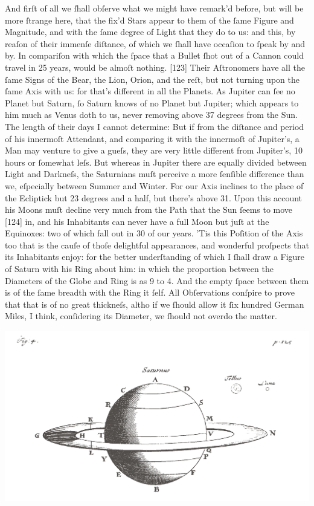 \documentclass[letterpaper]{book}
\begin{document}
And firſt of all we ſhall obſerve what we might have remark'd before, but
will be more ſtrange here, that the fix'd Stars appear to them of the ſame
Figure and Magnitude, and with the ſame degree of Light that they do to us:
and this, by reaſon of their immenſe diſtance, of which we ſhall have
occaſion to ſpeak by and by. In compariſon with which the ſpace that a
Bullet ſhot out of a Cannon could travel in 25 years, would be almoſt
nothing.  [123] Their Aſtronomers have all the ſame Signs of the Bear, the
Lion, Orion, and the reſt, but not turning upon the ſame Axis with us: for
that's different in all the Planets.  As Jupiter can ſee no Planet but
Saturn, ſo Saturn knows of no Planet but Jupiter; which appears to him much
as Venus doth to us, never removing above 37 degrees from the Sun. The
length of their days I cannot determine: But if from the diſtance and period
of his innermoſt Attendant, and comparing it with the innermoſt of
Jupiter's, a Man may venture to give a gueſs, they are very little different
from Jupiter's, 10 hours or ſomewhat leſs. But whereas in Jupiter there are
equally divided between Light and Darkneſs, the Saturnians muſt perceive a
more ſenſible difference than we, eſpecially between Summer and Winter. For
our Axis inclines to the place of the Ecliptick but 23 degrees and a half,
but there's above 31. Upon this account his Moons muſt decline very much
from the Path that the Sun ſeems to move [124] in, and his Inhabitants can
never have a full Moon but juſt at the Equinoxes: two of which fall out in
30 of our years. 'Tis this Poſition of the Axis too that is the cauſe of
thoſe delightful appearances, and wonderful proſpects that its Inhabitants
enjoy: for the better underſtanding of which I ſhall draw a Figure of Saturn
with his Ring about him: in which the proportion between the Diameters of
the Globe and Ring is as 9 to 4.  And the empty ſpace between them is of the
ſame breadth with the Ring it ſelf. All Obſervations conſpire to prove that
that is of no great thickneſs, altho if we ſhould allow it ſix hundred
German Miles, I think, conſidering its Diameter, we ſhould not overdo the
matter.  

\begin{center}
	\includegraphics[width=.90\textwidth]{ct_4_en.jpg}
\end{center}
\end{document}
